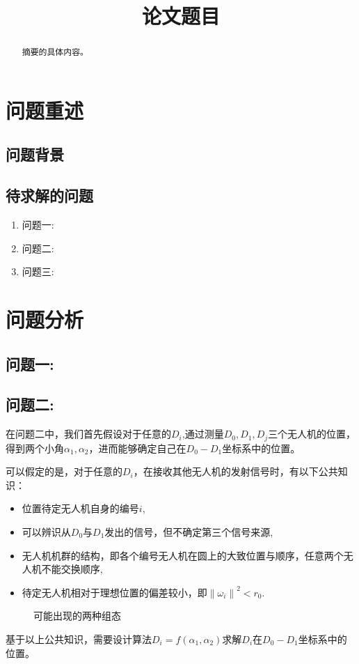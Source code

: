 \documentclass{cumcmthesis}
\title{论文题目}
\begin{document}
	\maketitle
	\begin{abstract}
		摘要的具体内容。
	\end{abstract}
	
	
	\section{问题重述}
		\subsection{问题背景}
		\par 
		\subsection{待求解的问题}
		\par 
			\begin{enumerate}
				\item{问题一:}
				\item{问题二:}
				\item{问题三:}
			\end{enumerate}
	\section{问题分析}
		\subsection{问题一:}
		\subsection{问题二:}
		在问题二中，我们首先假设对于任意的$D_i$,通过测量$D_0,D_1,D_j$三个无人机的位置，得到两个小角$\alpha_1,\alpha_2$，进而能够确定自己在$D_0 - D_1$坐标系中的位置。
		
		可以假定的是，对于任意的$D_i$，在接收其他无人机的发射信号时，有以下公共知识：
		\begin{itemize}
			\item	位置待定无人机自身的编号$i$,
			\item	可以辨识从$D_0$与$D_1$发出的信号，但不确定第三个信号来源,
			\item	无人机机群的结构，即各个编号无人机在圆上的大致位置与顺序，任意两个无人机不能交换顺序,
			\item 	待定无人机相对于理想位置的偏差较小，即$ {\lVert \omega_i \rVert}^2 < r_0 $.
		\end{itemize}
		\begin{figure}[htb]
			\centering
			\caption{可能出现的两种组态}
			\label{fig1}
		\end{figure}
		基于以上公共知识，需要设计算法$D_i = f(\alpha_1, \alpha_2)$求解$D_i$在$D_0 - D_1$坐标系中的位置。
\end{document}
